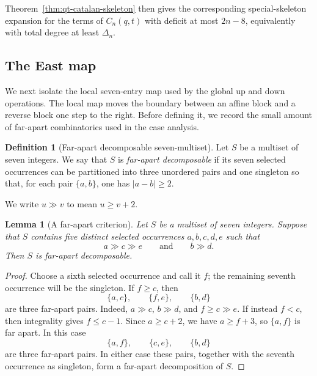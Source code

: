 \documentclass[11pt]{article}
\theoremstyle{plain}
\newtheorem{lemma}[theorem]{Lemma}
\theoremstyle{definition}
\newtheorem{definition}[theorem]{Definition}
\theoremstyle{remark}
\begin{document}
Theorem~\ref{thm:qt-catalan-skeleton} then gives the corresponding
special-skeleton expansion for the terms of \(C_n(q,t)\) with deficit at most
\(2n-8\), equivalently with total degree at least \(\Delta_n\).



\subsection{The East map}
\label{subsec:east-map}

We next isolate the local seven-entry map used by the global
\(\mathrm{up}\) and \(\mathrm{down}\) operations.  The local map moves the
boundary between an affine block and a reverse block one step to the right.
Before defining it, we record the small amount of far-apart combinatorics used
in the case analysis.

\begin{definition}[Far-apart decomposable seven-multiset]
\label{def:far-apart-decomposable}
Let \(S\) be a multiset of seven integers. We say that \(S\) is
\emph{far-apart decomposable} if its seven selected occurrences can be
partitioned into three unordered pairs and one singleton so that, for each pair
\(\{a,b\}\), one has \(|a-b|\ge 2\).
\end{definition}

We write \(u\gg v\) to mean \(u\ge v+2\).

\begin{lemma}[A far-apart criterion]
\label{lem:far-apart-separated-values}
Let \(S\) be a multiset of seven integers. Suppose that \(S\) contains five
distinct selected occurrences \(a,b,c,d,e\) such that
\[
  a\gg c\gg e
  \qquad\text{and}\qquad
  b\gg d.
\]
Then \(S\) is far-apart decomposable.
\end{lemma}

\begin{proof}
Choose a sixth selected occurrence and call it \(f\); the remaining seventh
occurrence will be the singleton.  If \(f\ge c\), then
\[
  \{a,c\},\qquad \{f,e\},\qquad \{b,d\}
\]
are three far-apart pairs.  Indeed, \(a\gg c\), \(b\gg d\), and
\(f\ge c\gg e\).  If instead \(f<c\), then integrality gives
\(f\le c-1\).  Since \(a\ge c+2\), we have \(a\ge f+3\), so
\(\{a,f\}\) is far apart.  In this case
\[
  \{a,f\},\qquad \{c,e\},\qquad \{b,d\}
\]
are three far-apart pairs.  In either case these pairs, together with the
seventh occurrence as singleton, form a far-apart decomposition of \(S\).
\end{proof}
\end{document}
